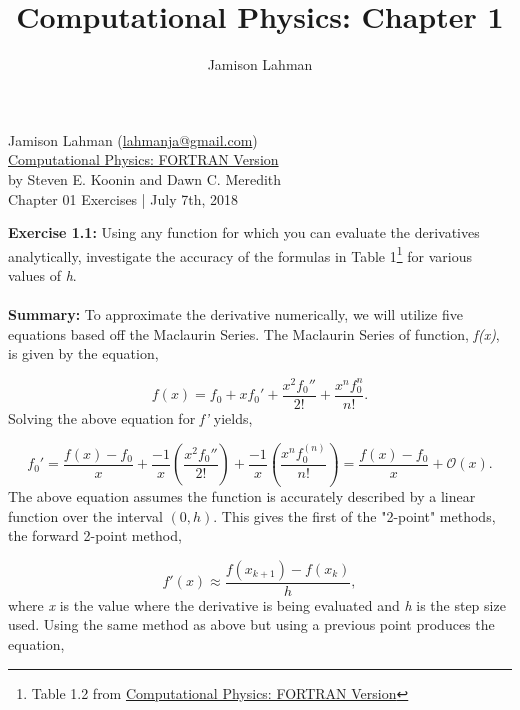 \documentclass[10pt]{article}
\author{Jamison Lahman}
\title{Computational Physics: Chapter 1}
\begin{document}
\begin{flushright}Jamison Lahman (\href{mailto:lahmanja@gmail.com}{lahmanja@gmail.com}) \\
\href{https://www.amazon.com/Computational-Physics-Fortran-Steven-Koonin/dp/0201386232}{Computational Physics: FORTRAN Version} \\
by Steven E. Koonin and Dawn C. Meredith\\
Chapter 01 Exercises | July 7th, 2018 \\
\end{flushright}
\textbf{Exercise 1.1:} Using any function for which you can evaluate the derivatives analytically, investigate the accuracy of the formulas in Table 1\footnote{Table 1.2 from \href{https://www.amazon.com/Computational-Physics-Fortran-Steven-Koonin/dp/0201386232}{Computational Physics: FORTRAN Version}} for various values of \textit{h}. \\
\\
\textbf{Summary:} To approximate the derivative numerically, we will utilize five equations based off the Maclaurin Series. The Maclaurin Series of function, \textit{f(x)}, is given by the equation,

\begin{equation}
	f(x) = f_0 +x f_0'+ \frac{x^2f_0''}{2!} + \frac{x^nf_0^{n}}{n!}.
\end{equation}
Solving the above equation for \textit{f'} yields,

\begin{equation}
	f_0' = \frac{f(x)-f_0}{x}+\frac{-1}{x}\left(\frac{x^2f_0''}{2!} \right)+ \frac{-1}{x} \left(\frac{x^nf_0^{(n)}}{n!}\right) =  \frac{f(x)-f_0}{x}  + \mathcal{O}(x).
\end{equation}
The above equation assumes the function is accurately described by a linear function over the interval $(0,h)$. This gives the first of the "2-point" methods, the forward 2-point method,

\begin{equation}
\label{eq:forward2}
	f'(x) \approx \frac{f(x_{k+1})-f(x_k)}{h},
\end{equation}
where \textit{x} is the value where the derivative is being evaluated and \textit{h} is the step size used. Using the same method as above but using a previous point produces the equation,
\end{document}
